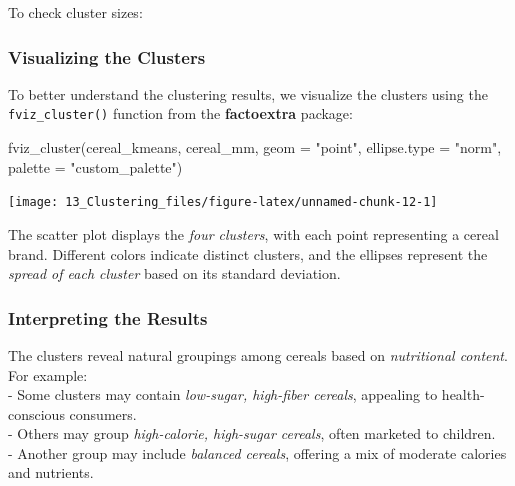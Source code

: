 \documentclass[
  11pt,
]{book}
\makeatletter
\newenvironment{Shaded}{}{}
\newcommand{\AttributeTok}[1]{#1}
\newcommand{\DecValTok}[1]{#1}
\newcommand{\FunctionTok}[1]{#1}
\newcommand{\NormalTok}[1]{#1}
\newcommand{\SpecialCharTok}[1]{\textcolor[rgb]{0.39,0.39,0.39}{#1}}
\newcommand{\StringTok}[1]{\textcolor[rgb]{0.39,0.39,0.39}{#1}}
\newenvironment{kframe}{%
\medskip{}
\setlength{\fboxsep}{.8em}
 \def\at@end@of@kframe{}%
 \ifinner\ifhmode%
  \def\at@end@of@kframe{\end{minipage}}%
  \begin{minipage}{\columnwidth}%
 \fi\fi%
 \def\FrameCommand##1{\hskip\@totalleftmargin \hskip-\fboxsep
 \colorbox{shadecolor}{##1}\hskip-\fboxsep
     \hskip-\linewidth \hskip-\@totalleftmargin \hskip\columnwidth}%
 \MakeFramed {\advance\hsize-\width
   \@totalleftmargin\z@ \linewidth\hsize
   \@setminipage}}%
 {\par\unskip\endMakeFramed%
 \at@end@of@kframe}
\renewenvironment{Shaded}{\begin{kframe}}{\end{kframe}}
\theoremstyle{definition}
\theoremstyle{definition}
\theoremstyle{definition}
\theoremstyle{definition}
\theoremstyle{remark}
\makeatother
\begin{document}
To check cluster sizes:

\begin{Shaded}
\end{Shaded}

\subsubsection*{Visualizing the Clusters}\label{visualizing-the-clusters}


To better understand the clustering results, we visualize the clusters using the \texttt{fviz\_cluster()} function from the \textbf{factoextra} package:

\begin{Shaded}
\begin{Highlighting}[]
\FunctionTok{fviz\_cluster}\NormalTok{(cereal\_kmeans, cereal\_mm, }\AttributeTok{geom =} \StringTok{"point"}\NormalTok{, }\AttributeTok{ellipse.type =} \StringTok{"norm"}\NormalTok{, }\AttributeTok{palette =} \StringTok{"custom\_palette"}\NormalTok{)}
\end{Highlighting}
\end{Shaded}

\begin{center}\texttt{[image: 13\_Clustering\_files/figure-latex/unnamed-chunk-12-1]} \end{center}

The scatter plot displays the \emph{four clusters}, with each point representing a cereal brand. Different colors indicate distinct clusters, and the ellipses represent the \emph{spread of each cluster} based on its standard deviation.

\subsubsection*{Interpreting the Results}\label{interpreting-the-results}


The clusters reveal natural groupings among cereals based on \emph{nutritional content}. For example:\\
- Some clusters may contain \emph{low-sugar, high-fiber cereals}, appealing to health-conscious consumers.\\
- Others may group \emph{high-calorie, high-sugar cereals}, often marketed to children.\\
- Another group may include \emph{balanced cereals}, offering a mix of moderate calories and nutrients.
\end{document}
